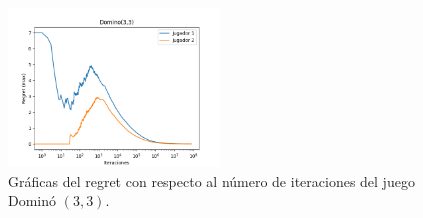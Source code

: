 \begin{figure}[h]
    \centering
    \includegraphics[width=0.5\textwidth]{graficas/cfr/domino/Domino(3,3).png}
    \caption{Gráficas del regret con respecto al número de iteraciones del juego Dominó $(3, 3)$.}
    \label{fig:cfr-regret-domino-3-3}
\end{figure}
